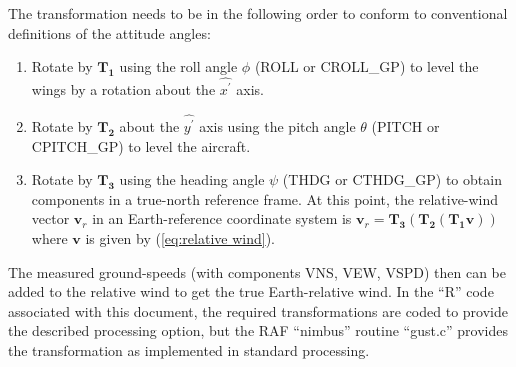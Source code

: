 \documentclass[12pt,twoside,english]{article}\usepackage[]{graphicx}\usepackage[]{color}
\let\OrgIndex\index
\renewcommand*{\index}[1]{\OrgIndex{#1}}
\begin{document}
The transformation needs to be in the following order to conform to conventional definitions of the attitude angles:  
\begin{enumerate}
\item Rotate by $\mathbf{T_{1}}$ using the roll angle $\phi$ (ROLL or CROLL\_GP) to level the wings by a rotation about the $\hat{x^{\prime}}$ axis.  
\item Rotate by $\mathbf{T_{2}}$ about the $\hat{y^{\prime}}$ axis using the pitch angle $\theta$ (PITCH or CPITCH\_GP) to level the aircraft.  
\item Rotate by $\mathbf{T_{3}}$ using the heading angle $\psi$ (THDG or CTHDG\_GP) to obtain components in a true-north reference frame. At this point, the relative-wind vector $\mathbf{v}_r$ in an Earth-reference coordinate system is $\mathbf{v}_{r}=\mathbf{T_{3}}(\mathbf{T_{2}}(\mathbf{T_{1}}\mathbf{v}))$ where $\mathbf{v}$ is given by (\ref{eq:relative wind}).  
\end{enumerate}
The measured ground-speeds (with components VNS, VEW, VSPD) then can be added to the relative wind to get the true Earth-relative wind. In the ``R'' code associated with this document, the required transformations are coded to provide the described processing option, but the RAF ``nimbus'' routine ``gust.c'' provides the transformation as implemented in standard processing. 
\end{document}
